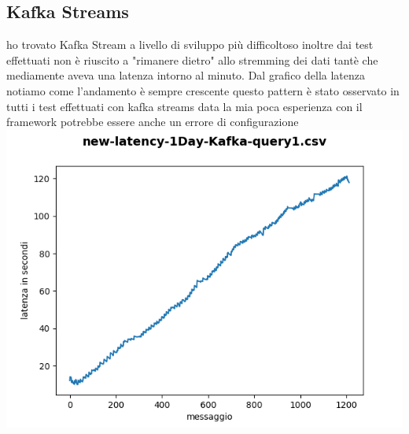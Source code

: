 \documentclass[acmsmall]{acmart}
\begin{document}
\subsection{Kafka Streams}
ho trovato Kafka Stream a livello di sviluppo più difficoltoso inoltre dai test effettuati non è riuscito a "rimanere dietro" allo stremming dei dati tantè che mediamente aveva una latenza intorno al minuto.
Dal grafico della latenza notiamo come l'andamento è sempre crescente 
questo pattern è stato osservato in tutti i test effettuati con kafka streams data la mia poca esperienza con il framework potrebbe essere anche un errore di configurazione \\
\includegraphics[width=14cm]{../results/tempi/new-latency-1Day-Kafka-query1.csv.png}

 
\end{document}
